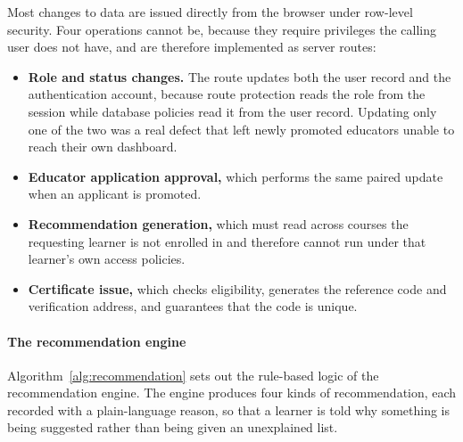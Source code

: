 \documentclass[12pt, oneside]{article} %
\begin{document}
Most changes to data are issued directly from the browser under row-level security. Four operations cannot be, because they require privileges the calling user does not have, and are therefore implemented as server routes:

\begin{itemize}
    \item \textbf{Role and status changes.} The route updates both the user record and the authentication account, because route protection reads the role from the session while database policies read it from the user record. Updating only one of the two was a real defect that left newly promoted educators unable to reach their own dashboard.
    \item \textbf{Educator application approval,} which performs the same paired update when an applicant is promoted.
    \item \textbf{Recommendation generation,} which must read across courses the requesting learner is not enrolled in and therefore cannot run under that learner's own access policies.
    \item \textbf{Certificate issue,} which checks eligibility, generates the reference code and verification address, and guarantees that the code is unique.
\end{itemize}

\paragraph{The recommendation engine}

Algorithm~\ref{alg:recommendation} sets out the rule-based logic of the recommendation engine. The engine produces four kinds of recommendation, each recorded with a plain-language reason, so that a learner is told why something is being suggested rather than being given an unexplained list.
\end{document}
